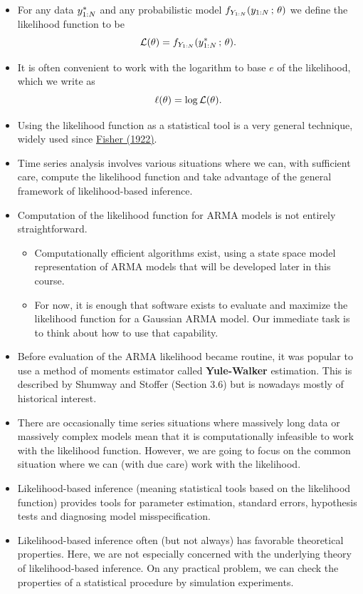 \documentclass[]{article}
\begin{document}
\begin{itemize}
\item
  For any data \(y_{1:N}^*\) and any probabilistic model
  \(f_{Y_{1:N}}(y_{1:N}\, ; \,\theta)\) we define the likelihood
  function to be
  \[ \mathcal{L}(\theta) = f_{Y_{1:N}}(y_{1:N}^*\, ; \,\theta).\]
\item
  It is often convenient to work with the logarithm to base \(e\) of the
  likelihood, which we write as \[\ell(\theta) = \log \mathcal{L}(\theta).\]
\item
  Using the likelihood function as a statistical tool is a very general
  technique, widely used since
  \href{https://en.wikipedia.org/wiki/Likelihood_function}{Fisher
  (1922)}.
\item
  Time series analysis involves various situations where we can, with
  sufficient care, compute the likelihood function and take advantage of
  the general framework of likelihood-based inference.
\item
  Computation of the likelihood function for ARMA models is not entirely
  straightforward.

  \begin{itemize}
  \item
    Computationally efficient algorithms exist, using a state space
    model representation of ARMA models that will be developed later in
    this course.
  \item
    For now, it is enough that software exists to evaluate and maximize
    the likelihood function for a Gaussian ARMA model. Our immediate
    task is to think about how to use that capability.
  \end{itemize}
\item
  Before evaluation of the ARMA likelihood became routine, it was
  popular to use a method of moments estimator called
  \textbf{Yule-Walker} estimation. This is described by Shumway and
  Stoffer (Section 3.6) but is nowadays mostly of historical interest.
\item
  There are occasionally time series situations where massively long
  data or massively complex models mean that it is computationally
  infeasible to work with the likelihood function. However, we are going
  to focus on the common situation where we can (with due care) work
  with the likelihood.
\item
  Likelihood-based inference (meaning statistical tools based on the
  likelihood function) provides tools for parameter estimation, standard
  errors, hypothesis tests and diagnosing model misspecification.
\item
  Likelihood-based inference often (but not always) has favorable
  theoretical properties. Here, we are not especially concerned with the
  underlying theory of likelihood-based inference. On any practical
  problem, we can check the properties of a statistical procedure by
  simulation experiments.
\end{itemize}
\end{document}
